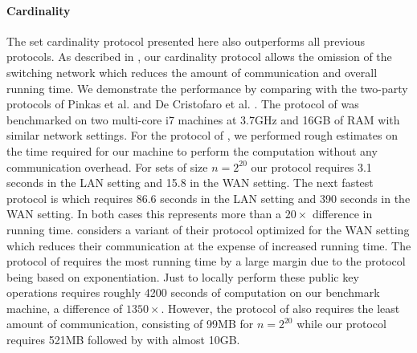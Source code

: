 \paragraph{Cardinality} The set cardinality protocol presented here also outperforms all previous protocols. As described in , our cardinality protocol allows the omission of the switching network which reduces the amount of communication and overall running time. We demonstrate the performance by comparing with the two-party protocols of Pinkas et al. \cite{PSWW18} and De Cristofaro et al. \cite{DBLP:conf/cans/CristofaroGT12}. The protocol of  \cite{PSWW18} was benchmarked on two multi-core i7 machines at 3.7GHz and 16GB of RAM with similar network settings. For the protocol of \cite{DBLP:conf/cans/CristofaroGT12}, we performed rough estimates on the time required for our machine to perform the computation without any communication overhead. For sets of size $n=2^{20}$ our protocol requires 3.1 seconds in the LAN setting and 15.8 in the WAN setting. The next fastest protocol is \cite{PSWW18} which requires 86.6 seconds in the LAN setting and 390 seconds in the WAN setting. In both cases this represents more than a $20\times$ difference in running time.  \cite{PSWW18} considers a variant of their protocol optimized for the WAN setting which reduces their communication at the expense of increased running time. The protocol of \cite{DBLP:conf/cans/CristofaroGT12} requires the most running time by a large margin due to the protocol being based on exponentiation. Just to locally perform these public key operations requires roughly 4200 seconds of computation on our benchmark machine, a difference of $1350\times$. However, the protocol of \cite{DBLP:conf/cans/CristofaroGT12} also requires the least amount of communication, consisting of 99MB for $n=2^{20}$ while our protocol requires 521MB followed by \cite{PSWW18}  with almost 10GB.


